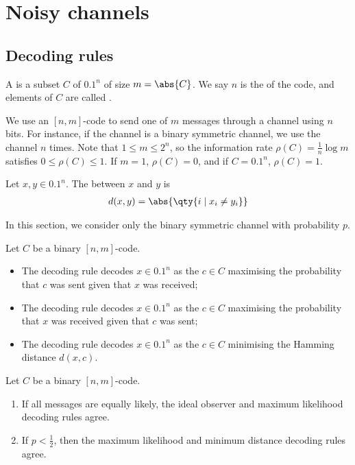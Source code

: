 \section{Noisy channels}

\subsection{Decoding rules}
\begin{definition}
    A  is a subset $C$ of $\qty{0,1}^n$ of size $m = \abs{C}$.
    We say $n$ is the  of the code, and elements of $C$ are called .
\end{definition}
We use an $[n,m]$-code to send one of $m$ messages through a channel using $n$ bits.
For instance, if the channel is a binary symmetric channel, we use the channel $n$ times.
Note that $1 \leq m \leq 2^n$, so the information rate $\rho(C) = \frac{1}{n} \log m$ satisfies $0 \leq \rho(C) \leq 1$.
If $m = 1$, $\rho(C) = 0$, and if $C = \qty{0,1}^n$, $\rho(C) = 1$.
\begin{definition}
    Let $x, y \in \qty{0,1}^n$.
    The  between $x$ and $y$ is
    \begin{align*}
        d(x,y) = \abs{\qty{i \mid x_i \neq y_i}}
    \end{align*}
\end{definition}
In this section, we consider only the binary symmetric channel with probability $p$.
\begin{definition}
    Let $C$ be a binary $[n,m]$-code.
    \begin{itemize}
        \item The  decoding rule decodes $x \in \qty{0,1}^n$ as the $c \in C$ maximising the probability that $c$ was sent given that $x$ was received;
        \item The  decoding rule decodes $x \in \qty{0,1}^n$ as the $c \in C$ maximising the probability that $x$ was received given that $c$ was sent;
        \item The  decoding rule decodes $x \in \qty{0,1}^n$ as the $c \in C$ minimising the Hamming distance $d(x,c)$.
    \end{itemize}
\end{definition}
\begin{lemma}
    Let $C$ be a binary $[n,m]$-code.
    \begin{enumerate}
        \item If all messages are equally likely, the ideal observer and maximum likelihood decoding rules agree.
        \item If $p < \frac{1}{2}$, then the maximum likelihood and minimum distance decoding rules agree.
    \end{enumerate}
\end{lemma}
